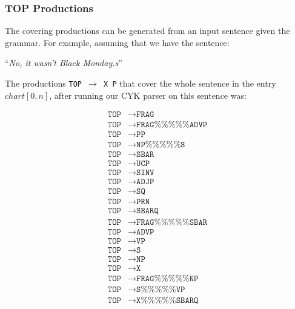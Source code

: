 \documentclass[a4paper,11pt]{article}
\begin{document}
\subsubsection{TOP Productions}
The covering productions can be generated from an input sentence given
the grammar. For example, assuming that we have the sentence:
\begin{center}
``\textit{No, it wasn't Black Monday.s}''
\end{center}
The productions \texttt{TOP $\rightarrow$ X P} that cover the whole sentence in the  entry $chart[0, n]$, after running our CYK parser on this sentence was:
\begin{scriptsize}
\begin{align*}
\texttt{TOP} &\rightarrow \texttt{FRAG} \\
\texttt{TOP} &\rightarrow  \texttt{FRAG\%\%\%\%\%ADVP} \\
\texttt{TOP} &\rightarrow  \texttt{PP} \\
\texttt{TOP} &\rightarrow  \texttt{NP\%\%\%\%\%S} \\
\texttt{TOP} &\rightarrow  \texttt{SBAR} \\
\texttt{TOP}  &\rightarrow \texttt{UCP} \\
\texttt{TOP}  &\rightarrow \texttt{SINV} \\
\texttt{TOP} &\rightarrow  \texttt{ADJP} \\
\texttt{TOP} &\rightarrow  \texttt{SQ}\\
\texttt{TOP} &\rightarrow  \texttt{PRN} \\
\texttt{TOP} &\rightarrow  \texttt{SBARQ} \\
\texttt{TOP} &\rightarrow  \texttt{FRAG\%\%\%\%\%SBAR} \\
\texttt{TOP}  &\rightarrow \texttt{ADVP} \\
\texttt{TOP}  &\rightarrow \texttt{VP} \\
\texttt{TOP} &\rightarrow  \texttt{S} \\
\texttt{TOP} &\rightarrow  \texttt{NP} \\
\texttt{TOP}  &\rightarrow \texttt{X} \\
\texttt{TOP} &\rightarrow  \texttt{FRAG\%\%\%\%\%NP} \\
\texttt{TOP}  &\rightarrow \texttt{S\%\%\%\%\%VP} \\
\texttt{TOP}  &\rightarrow \texttt{X\%\%\%\%\%SBARQ} \\
\end{align*}

\end{scriptsize}
\end{document}
